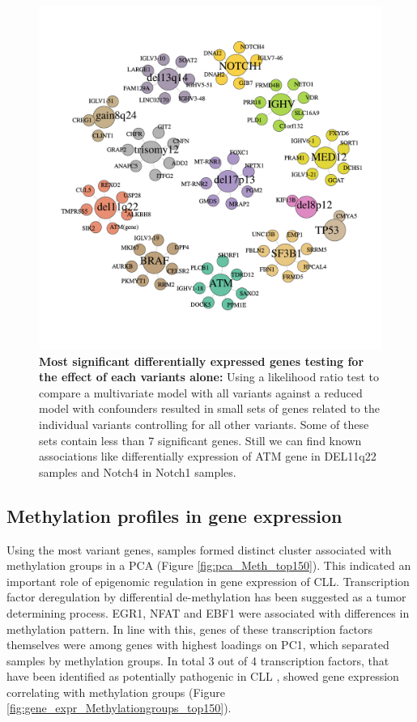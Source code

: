 \begin{figure}
	\centering
	\includegraphics[width=\columnwidth]{./Figures/reducedModel.pdf}
	\caption{\textbf{Most significant differentially expressed genes testing for the effect of each variants alone:} Using a likelihood ratio test to compare a multivariate model with all variants against a reduced model with confounders resulted in small sets of genes related to the individual variants controlling for all other variants. Some of these sets contain less than 7 significant genes. Still we can find known associations like differentially expression of ATM gene in DEL11q22 samples and Notch4 in Notch1 samples.}
	\label{fig:reducedModel}
\end{figure}

\FloatBarrier



\subsection{Methylation profiles in gene expression}
Using the most variant genes, samples formed distinct cluster associated with methylation groups in a PCA (Figure  \ref{fig:pca_Meth_top150}). This indicated an important role of epigenomic regulation in gene expression of CLL. Transcription factor deregulation by differential de-methylation has been suggested as a tumor determining process. EGR1, NFAT and EBF1 were associated with differences in methylation pattern. In line with this, genes of these transcription factors themselves were among genes with highest loadings on PC1, which separated samples by methylation groups. In total 3 out of 4 transcription factors, that have been identified as potentially pathogenic in CLL \citep{Oakes2016}, showed gene expression correlating with methylation groups (Figure \ref{fig:gene_expr_Methylationgroups_top150}). 

